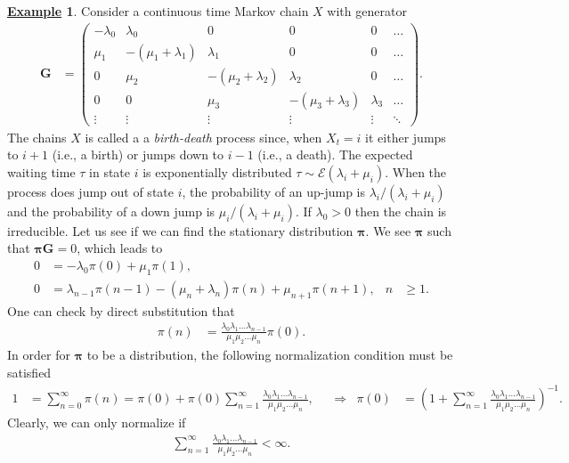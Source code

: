 \documentclass[12pt]{book}
\numberwithin{equation}{chapter}
\theoremstyle{plain}
\numberwithin{theorem}{section}
\theoremstyle{definition}
\newtheorem{example}[theorem]{\underline{Example}}
\numberwithin{exercise}{chapter}
\newcommand{\<}{\langle}
\renewcommand{\>}{\rangle}
\renewcommand{\(}{\left(}
\renewcommand{\)}{\right)}
\renewcommand{\[}{\left[}
\renewcommand{\]}{\right]}
\newcommand\Ec{\mathscr{E}}
\newcommand\lam{\lambda}
\newcommand\Gv{\pmb{G}}
\newcommand\piv{\pmb{\pi}}
\begin{document}
\begin{example}
\label{ex:birth-death}
Consider a continuous time Markov chain $X$ with generator
\begin{align}
\Gv
	&=	\( \begin{array}{cccccc}
			-\lam_0 & \lam_0 & 0 & 0 & 0 & \ldots \\
			\mu_1 & - (\mu_1 + \lam_1) & \lam_1 & 0 & 0 & \ldots \\
			0 & \mu_2 & - (\mu_2 + \lam_2) & \lam_2 & 0 & \ldots \\
			0 & 0 & \mu_3 & - (\mu_3 + \lam_3) & \lam_3 & \ldots \\
			\vdots & \vdots & \vdots & \vdots & \vdots & \ddots 
			\end{array} \) .
\end{align}
The chains $X$ is called a a \emph{birth-death} process since, when $X_t = i$ it either jumps to $i+1$ (i.e., a birth) or jumps down to $i-1$ (i.e., a death).  The expected waiting time $\tau$ in state $i$ is exponentially distributed $\tau \sim \Ec(\lam_i + \mu_i)$.  When the process does jump out of state $i$, the probability of an up-jump is $\lam_i / (\lam_i+\mu_i)$ and the probability of a down jump is $\mu_i / (\lam_i+\mu_i)$.  If $\lam_0 >0$ then the chain is irreducible.  Let us see if we can find the stationary distribution $\piv$.  We see $\piv$ such that $\piv \Gv = 0$, which leads to
\begin{align}
0
	&=	-\lam_0 \pi(0) + \mu_1 \pi(1) , \\
0
	&=	\lam_{n-1} \pi(n-1) - (\mu_n + \lam_n) \pi(n) + \mu_{n+1} \pi(n+1) , &
n
	&\geq 1 .
\end{align}
One can check by direct substitution that
\begin{align}
\pi(n)
	&=	\frac{\lam_0 \lam_1 \ldots \lam_{n-1}}{\mu_1 \mu_2 \ldots \mu_n}\pi(0) .
\end{align}
In order for $\piv$ to be a distribution, the following normalization condition must be satisfied
\begin{align}
1
	&=	\sum_{n=0}^\infty \pi(n) 
	=		\pi(0) + \pi(0) \sum_{n=1}^\infty \frac{\lam_0 \lam_1 \ldots \lam_{n-1}}{\mu_1 \mu_2 \ldots \mu_n} , &
	&		\Rightarrow &
\pi(0)
	&=	\( 1 + \sum_{n=1}^\infty \frac{\lam_0 \lam_1 \ldots \lam_{n-1}}{\mu_1 \mu_2 \ldots \mu_n}  \)^{-1} .
\end{align}
Clearly, we can only normalize if
\begin{align}
\sum_{n=1}^\infty \frac{\lam_0 \lam_1 \ldots \lam_{n-1}}{\mu_1 \mu_2 \ldots \mu_n} < \infty .
\end{align}
\end{example}
\end{document}
